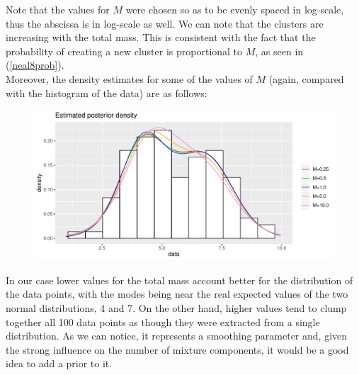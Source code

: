 Note that the values for $M$ were chosen so as to be evenly spaced in log-scale, thus the abscissa is in log-scale as well.
We can note that the clusters are increasing with the total mass.
This is consistent with the fact that the probability of creating a new cluster is proportional to $M$, as seen in (\ref{neal8prob}). \\
Moreover, the density estimates for some of the values of $M$ (again, compared with the histogram of the data) are as follows:
\begin{figure}[h]
	\centering
	\includegraphics[scale=0.6]{etc/dens_withMm3.pdf}
\end{figure}

In our case lower values for the total mass account better for the distribution of the data points, with the modes being near the real expected values of the two normal distributions, 4 and 7.
On the other hand, higher values tend to clump together all 100 data points as though they were extracted from a single distribution.
As we can notice, it represents a smoothing parameter and, given the strong influence on the number of mixture components, it would be a good idea to add a prior to it.

\clearpage

